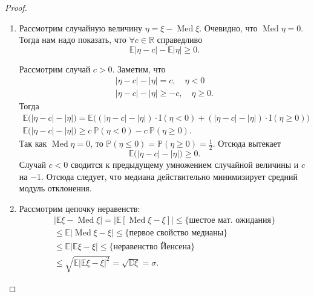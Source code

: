 \begin{proof}
    \begin{enumerate}
        \item Рассмотрим случайную величину $\eta = \xi - \operatorname{Med}\xi$. Очевидно, что $\operatorname{Med} \eta = 0$. Тогда нам надо показать, что $\forall c \in \mathbb{R} $ справедливо 
        \begin{equation*}
            \mathbb{E} |\eta - c| - \mathbb{E}|\eta| \geqslant 0.
        \end{equation*}
        
        Рассмотрим случай $c > 0$. Заметим, что 
        \begin{gather*}
            |\eta - c| - |\eta| = c, \quad \eta < 0 \\
            |\eta - c| - |\eta|  \geqslant -c, \quad \eta \geqslant 0.
        \end{gather*}
        Тогда
        \begin{gather*}
            \mathbb{E} \bigl(|\eta - c| - |\eta| \bigl) 
            = \mathbb{E} \bigl( (|\eta - c| - |\eta|) \cdot \mathrm{I}(\eta < 0) + (|\eta - c| - |\eta|) \cdot \mathrm{I}(\eta \geqslant 0) \bigl) \\
            \mathbb{E} \bigl( |\eta - c| - |\eta| \bigl) \geqslant c~\mathbb{P}(\eta < 0) - c~\mathbb{P}(\eta \geqslant 0).
        \end{gather*}
        Так как $\operatorname{Med}\eta = 0$, то $\mathbb{P}(\eta \leqslant 0) = \mathbb{P}(\eta \geqslant 0) = \frac{1}{2}$.
        Отсюда вытекает
        \begin{equation*}
            \mathbb{E}\bigl( |\eta - c| - |\eta| \bigl) \geqslant 0.
        \end{equation*}
        Случай $c < 0$ сводится к предыдущему умножением случайной величины и $c$ на $-1$. Отсюда следует, что медиана действительно минимизирует средний модуль отклонения.
        \item Рассмотрим цепочку неравенств:
        \begin{multline*}
            |\mathbb{E}\xi - \operatorname{Med}\xi| =
            |\mathbb{E}\left[ \operatorname{Med}\xi - \xi \right]| \leqslant 
            {\text{\{шестое мат. ожидания\}}} \\ \leqslant \mathbb{E} |\operatorname{Med}\xi - \xi|
            \leqslant {\text{\{первое свойство медианы\}}} \\ \leqslant
            \mathbb{E}| \mathbb{E}\xi - \xi| \leqslant
            {\text{\{неравенство Йенсена\}}} \\ 
            \leqslant
            \sqrt{\mathbb{E}| \mathbb{E}\xi - \xi|^2} = 
            \sqrt{\mathbb{D}\xi} = \sigma.
        \end{multline*}
    \end{enumerate}
\end{proof}

